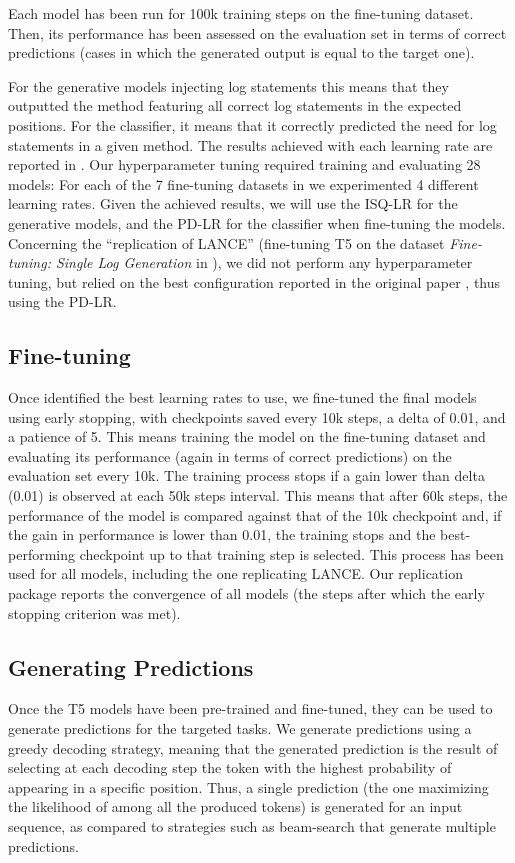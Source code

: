 Each model has been run for 100k training steps on the fine-tuning dataset. Then, its performance has been assessed on the evaluation set in terms of correct predictions (\ie cases in which the generated output is equal to the target one). 

For the generative models injecting log statements this means that they outputted the \java method featuring all correct log statements in the expected positions. For the classifier, it means that it correctly predicted the need for log statements in a given method. The results achieved with each learning rate are reported in . Our hyperparameter tuning required training and evaluating 28 models: For each of the 7 fine-tuning datasets in  we experimented 4 different learning rates. Given the achieved results, we will use the ISQ-LR for the generative models, and the PD-LR for the classifier when fine-tuning the models. Concerning the ``replication of LANCE'' (\ie fine-tuning T5 on the dataset \emph{Fine-tuning: Single Log Generation} in ), we did not perform any hyperparameter tuning, but relied on the best configuration reported in the original paper \cite{mastropaolo2021studying}, thus using the PD-LR.





\subsection{Fine-tuning}
Once identified the best learning rates to use, we fine-tuned the final models using early stopping, with checkpoints saved every 10k steps, a delta of 0.01, and a patience of 5. This means training the model on the fine-tuning dataset and evaluating its performance (again in terms of correct predictions) on the evaluation set every 10k. The training process stops if a gain lower than delta (0.01) is observed at each  50k steps interval. This means that after 60k steps, the performance of the model is compared against that of the 10k checkpoint and, if the gain in performance is lower than 0.01, the training stops and the best-performing checkpoint up to that training step is selected. This process has been used for all models, including the one replicating LANCE. Our replication package \cite{replication} reports the convergence of all models (\ie the steps after which the early stopping criterion was met). 


\subsection{Generating Predictions}
Once the T5 models have been pre-trained and fine-tuned, they can be used to generate predictions for the targeted tasks. We generate predictions using a greedy decoding strategy, meaning that the generated prediction is the result of selecting at each decoding step the token with the highest probability of appearing in a specific position. Thus, a single prediction (\ie the one maximizing the likelihood of among all the produced tokens) is generated for an input sequence, as compared to strategies such as beam-search \cite{freitag2017beam} that generate multiple predictions.
